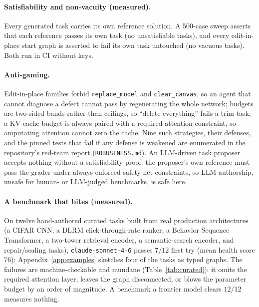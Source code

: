 \documentclass{article}
\begin{document}
\paragraph{Satisfiability and non-vacuity (measured).} Every generated task carries its own reference solution. A 500-case sweep asserts that each reference passes its own task (no unsatisfiable tasks), and every edit-in-place start graph is asserted to fail its own task untouched (no vacuous tasks). Both run in CI without keys.

\paragraph{Anti-gaming.} Edit-in-place families forbid \texttt{replace\_model} and \texttt{clear\_canvas}, so an agent that cannot diagnose a defect cannot pass by regenerating the whole network; budgets are two-sided bands rather than ceilings, so ``delete everything'' fails a trim task; a KV-cache budget is always paired with a required-attention constraint, so amputating attention cannot zero the cache. Nine such strategies, their defenses, and the pinned tests that fail if any defense is weakened are enumerated in the repository's red-team report (\texttt{ROBUSTNESS.md}). An LLM-driven task proposer accepts nothing without a satisfiability proof: the proposer's own reference must pass the grader under always-enforced safety-net constraints, so LLM authorship, unsafe for human- or LLM-judged benchmarks, is safe here.

\paragraph{A benchmark that bites (measured).} On twelve hand-authored curated tasks built from real production architectures (a CIFAR CNN, a DLRM click-through-rate ranker, a Behavior Sequence Transformer, a two-tower retrieval encoder, a semantic-search encoder, and repair/scaling tasks), \texttt{claude-sonnet-4-6} passes $7/12$ first try (mean health score $76$); Appendix~\ref{app:examples} sketches four of the tasks as typed graphs. The failures are machine-checkable and mundane (Table~\ref{tab:curated}): it omits the required attention layer, leaves the graph disconnected, or blows the parameter budget by an order of magnitude. A benchmark a frontier model clears $12/12$ measures nothing.
\end{document}
